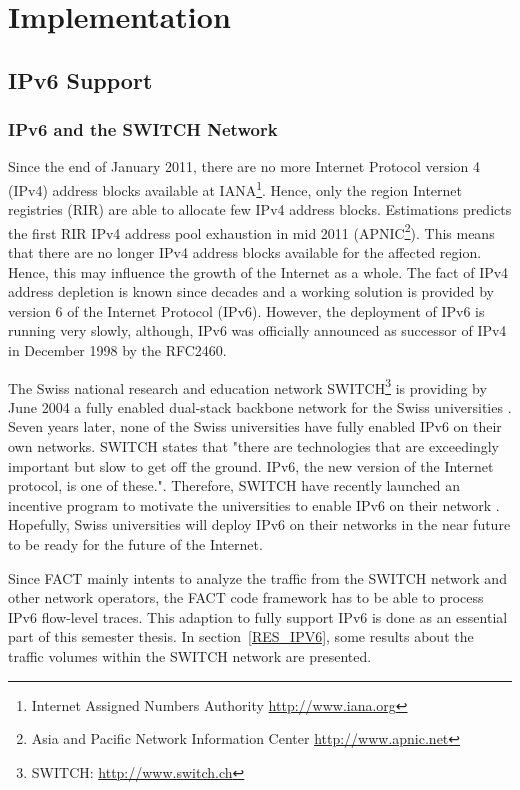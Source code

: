

\chapter{Implementation 
\label{Tasks}}

\section{IPv6 Support} 
\subsection{IPv6 and the SWITCH Network} Since the end of
January 2011, there are no more Internet Protocol version 4 (IPv4) address
blocks available at IANA\footnote{Internet Assigned Numbers Authority
\url{http://www.iana.org}}. Hence, only the region Internet registries (RIR) are
able to allocate few IPv4 address blocks. Estimations \cite{Huston:potaroo}
predicts the first RIR IPv4 address pool exhaustion in mid 2011
(APNIC\footnote{Asia and Pacific Network Information Center
\url{http://www.apnic.net}}). This means that there are no longer IPv4 address
blocks available for the affected region. Hence, this may influence the growth
of the Internet as a whole. The fact of IPv4 address depletion is known since
decades and a working solution is provided by version 6 of the Internet Protocol
(IPv6). However, the deployment of IPv6 is running very slowly, although, IPv6
was officially announced as successor of IPv4 in December 1998 by the RFC2460.

The Swiss national research and education network SWITCH\footnote{SWITCH:
\url{http://www.switch.ch}} is providing by June 2004 a fully enabled dual-stack
backbone network for the Swiss universities \cite{SWITCH:IPv6}. Seven years
later, none of the Swiss universities have fully enabled IPv6 on their own
networks. SWITCH states that "there are technologies that are exceedingly
important but slow to get off the ground. IPv6, the new version of the Internet
protocol, is one of these."\cite{SWITCH:IPv6_incent}. Therefore, SWITCH have
recently launched an incentive program to motivate the universities to enable
IPv6 on their network \cite{SWITCH:IPv6}. Hopefully, Swiss universities will
deploy IPv6 on their networks in the near future to be ready for the future of
the Internet.

Since FACT mainly intents to analyze the traffic from the SWITCH network and
other network operators, the FACT code framework has to be able to process IPv6
flow-level traces. This adaption to fully support IPv6 is done as an essential
part of this semester thesis. In section \ref{RES_IPV6}, some results about the
traffic volumes within the SWITCH network are presented.

